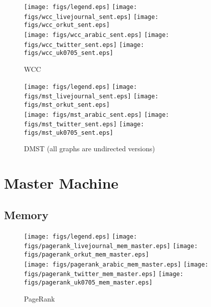 \documentclass{article}
\newcommand{\bline}[1][1]{\vspace{#1\baselineskip}}
\begin{document}
\begin{figure}[!h]
  \bline[3.5]
  \centering
  \texttt{[image: figs/legend.eps]}\hspace{3em}%
  \texttt{[image: figs/wcc\_livejournal\_sent.eps]}\hspace{1em}%
  \texttt{[image: figs/wcc\_orkut\_sent.eps]}\\
  \texttt{[image: figs/wcc\_arabic\_sent.eps]}\hspace{1em}%
  \texttt{[image: figs/wcc\_twitter\_sent.eps]}\hspace{1em}%
  \texttt{[image: figs/wcc\_uk0705\_sent.eps]}
  \caption{WCC}
\end{figure}

\begin{figure}[!h]
  \bline[3.5]
  \centering
  \texttt{[image: figs/legend.eps]}\hspace{3em}%
  \texttt{[image: figs/mst\_livejournal\_sent.eps]}\hspace{1em}%
  \texttt{[image: figs/mst\_orkut\_sent.eps]}\\
  \texttt{[image: figs/mst\_arabic\_sent.eps]}\hspace{1em}%
  \texttt{[image: figs/mst\_twitter\_sent.eps]}\hspace{1em}%
  \texttt{[image: figs/mst\_uk0705\_sent.eps]}
  \caption{DMST (all graphs are undirected versions)}
\end{figure}

\pagebreak
\section{Master Machine}
\label{sec:master}
\subsection{Memory}
\begin{figure}[!h]
  \centering
  \texttt{[image: figs/legend.eps]}\hspace{3em}%
  \texttt{[image: figs/pagerank\_livejournal\_mem\_master.eps]}\hspace{1em}%
  \texttt{[image: figs/pagerank\_orkut\_mem\_master.eps]}\\
  \texttt{[image: figs/pagerank\_arabic\_mem\_master.eps]}\hspace{1em}%
  \texttt{[image: figs/pagerank\_twitter\_mem\_master.eps]}\hspace{1em}%
  \texttt{[image: figs/pagerank\_uk0705\_mem\_master.eps]}
  \caption{PageRank}
\end{figure}
\end{document}
